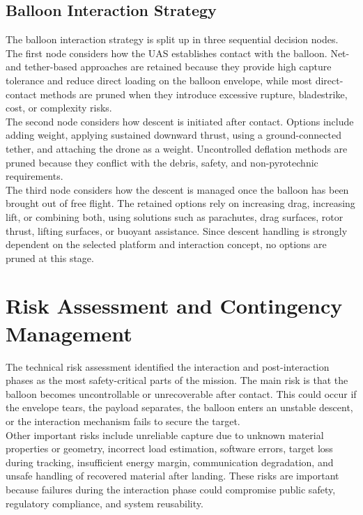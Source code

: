 \subsection*{Balloon Interaction Strategy}

The balloon interaction strategy is split up in three sequential decision nodes. The first node considers how the UAS establishes contact with the balloon. Net- and tether-based approaches are retained because they provide high capture tolerance and reduce direct loading on the balloon envelope, while most direct-contact methods are pruned when they introduce excessive rupture, bladestrike, cost, or complexity risks.\\

The second node considers how descent is initiated after contact. Options include adding weight, applying sustained downward thrust, using a ground-connected tether, and attaching the drone as a weight. Uncontrolled deflation methods are pruned because they conflict with the debris, safety, and non-pyrotechnic requirements.\\

The third node considers how the descent is managed once the balloon has been brought out of free flight. The retained options rely on increasing drag, increasing lift, or combining both, using solutions such as parachutes, drag surfaces, rotor thrust, lifting surfaces, or buoyant assistance. Since descent handling is strongly dependent on the selected platform and interaction concept, no options are pruned at this stage.\\

\section*{Risk Assessment and Contingency Management}

The technical risk assessment identified the interaction and post-interaction phases as the most safety-critical parts of the mission. The main risk is that the balloon becomes uncontrollable or unrecoverable after contact. This could occur if the envelope tears, the payload separates, the balloon enters an unstable descent, or the interaction mechanism fails to secure the target.
\\

Other important risks include unreliable capture due to unknown material properties or geometry, incorrect load estimation, software errors, target loss during tracking, insufficient energy margin, communication degradation, and unsafe handling of recovered material after landing. These risks are important because failures during the interaction phase could compromise public safety, regulatory compliance, and system reusability.
\\

